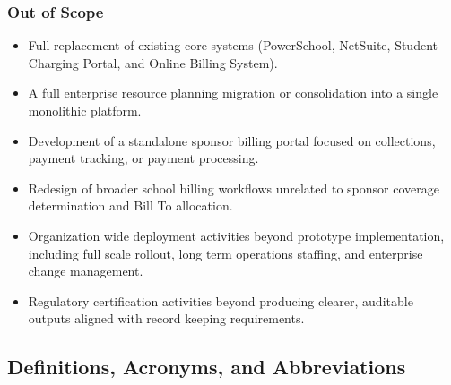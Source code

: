 \documentclass[12pt,a4paper]{article}
\begin{document}
\subsubsection{Out of Scope}
\begin{itemize}
  \item Full replacement of existing core systems (PowerSchool, NetSuite, Student Charging Portal, and Online Billing System).
  \item A full enterprise resource planning migration or consolidation into a single monolithic platform.
  \item Development of a standalone sponsor billing portal focused on collections, payment tracking, or payment processing.
  \item Redesign of broader school billing workflows unrelated to sponsor coverage determination and Bill To allocation.
  \item Organization wide deployment activities beyond prototype implementation, including full scale rollout, long term operations staffing, and enterprise change management.
  \item Regulatory certification activities beyond producing clearer, auditable outputs aligned with record keeping requirements.
\end{itemize}


\subsection{Definitions, Acronyms, and Abbreviations}
\end{document}
